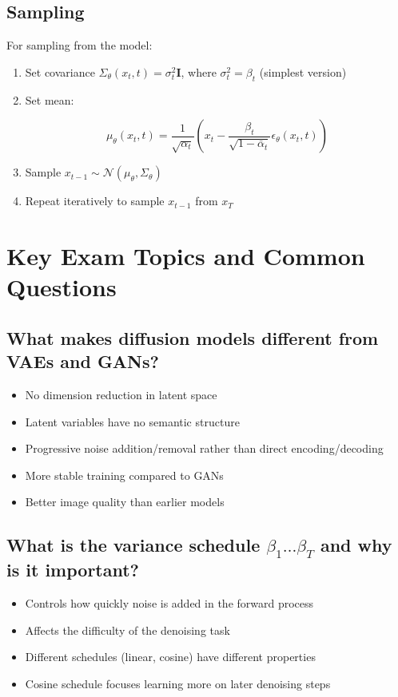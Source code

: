 \subsection*{Sampling}
For sampling from the model:
\begin{enumerate}
    \item Set covariance $\Sigma_\theta(x_t, t) = \sigma_t^2 \mathbf{I}$, where $\sigma_t^2 = \beta_t$ (simplest version)
    \item Set mean:
    \begin{definition}

    
    \[
    \mu_\theta(x_t, t) = \frac{1}{\sqrt{\alpha_t}} \left(x_t - \frac{\beta_t}{\sqrt{1 - \bar{\alpha}_t}} \epsilon_\theta(x_t, t)\right)
    \]
    \end{definition}
    \item Sample $x_{t-1} \sim \mathcal{N}(\mu_\theta, \Sigma_\theta)$
    \item Repeat iteratively to sample $x_{t-1}$ from $x_T$
\end{enumerate}



\section{Key Exam Topics and Common Questions}

\subsection*{What makes diffusion models different from VAEs and GANs?}
\begin{itemize}
    \item No dimension reduction in latent space
    \item Latent variables have no semantic structure
    \item Progressive noise addition/removal rather than direct encoding/decoding
    \item More stable training compared to GANs
    \item Better image quality than earlier models
\end{itemize}

\subsection*{What is the variance schedule $\beta_1 \ldots \beta_T$ and why is it important?}
\begin{itemize}
    \item Controls how quickly noise is added in the forward process
    \item Affects the difficulty of the denoising task
    \item Different schedules (linear, cosine) have different properties
    \item Cosine schedule focuses learning more on later denoising steps
\end{itemize}

